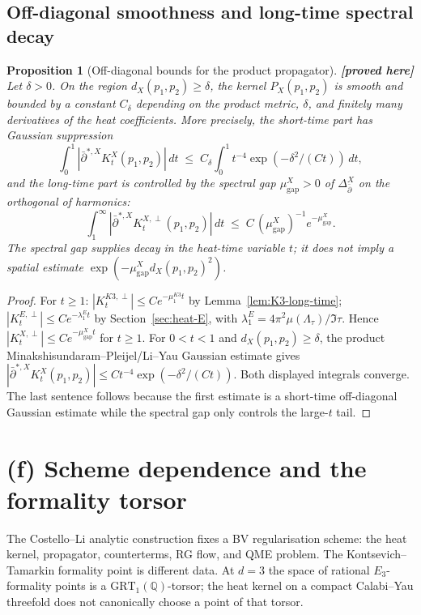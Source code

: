 \documentclass[11pt]{amsart}
\providecommand{\ClaimStatusProvedHere}[1][]{\textbf{[proved here]}}
\providecommand{\dbar}{\bar\partial}
\providecommand{\Q}{\mathbb{Q}}
\providecommand{\GRT}{\mathrm{GRT}}
\newtheorem{proposition}[theorem]{Proposition}
\theoremstyle{definition}
\theoremstyle{remark}
\begin{document}
\subsection{Off-diagonal smoothness and long-time spectral decay}

\begin{proposition}[Off-diagonal bounds for the product propagator]
\label{prop:off-diagonal-decay}
\ClaimStatusProvedHere
Let $\delta>0$. On the region
$d_X(p_1,p_2)\geq\delta$, the kernel $P_X(p_1,p_2)$ is smooth and
bounded by a constant $C_\delta$ depending on the product metric,
$\delta$, and finitely many derivatives of the heat coefficients. More
precisely, the short-time part has Gaussian suppression
\[
  \int_0^1 |\dbar^{*,X}K_t^X(p_1,p_2)|\,dt
  \;\leq\;
  C_\delta \int_0^1 t^{-4}\exp(-\delta^2/(C t))\,dt,
\]
and the long-time part is controlled by the spectral gap
$\mu_{\mathrm{gap}}^X>0$ of $\Delta_{\dbar}^X$ on the orthogonal of
harmonics:
\[
  \int_1^\infty |\dbar^{*,X}K_t^{X,\perp}(p_1,p_2)|\,dt
  \;\leq\; C\,(\mu_{\mathrm{gap}}^X)^{-1}e^{-\mu_{\mathrm{gap}}^X}.
\]
The spectral gap supplies decay in the heat-time variable $t$; it does
not imply a spatial estimate
$\exp(-\mu_{\mathrm{gap}}^X d_X(p_1,p_2)^2)$.
\end{proposition}

\begin{proof}
For $t \geq 1$: $|K^{K3,\perp}_t| \leq C e^{-\mu_1^{K3} t}$ by
Lemma~\ref{lem:K3-long-time}; $|K^{E,\perp}_t| \leq
C e^{-\lambda_1^E t}$ by Section~\ref{sec:heat-E}, with
$\lambda_1^E=4\pi^2\mu(\Lambda_\tau)/\Im\tau$. Hence
$|K^{X,\perp}_t| \leq C e^{-\mu_{\mathrm{gap}}^X t}$ for $t \geq 1$.
For $0<t<1$ and $d_X(p_1,p_2)\geq\delta$, the product
Minakshisundaram--Pleijel/Li--Yau Gaussian estimate gives
$|\dbar^{*,X}K_t^X(p_1,p_2)|\leq C t^{-4}\exp(-\delta^2/(Ct))$.
Both displayed integrals converge. The last sentence follows because
the first estimate is a short-time off-diagonal Gaussian estimate while
the spectral gap only controls the large-$t$ tail.
\end{proof}

\section{(f) Scheme dependence and the formality torsor}
\label{sec:scheme-dep}

The Costello--Li analytic construction fixes a BV regularisation
scheme: the heat kernel, propagator, counterterms, RG flow, and QME
problem. The Kontsevich--Tamarkin formality point is different data.
At $d=3$ the space of rational $E_3$-formality points is a
$\GRT_1(\Q)$-torsor; the heat kernel on a compact Calabi--Yau
threefold does not canonically choose a point of that torsor.
\end{document}
